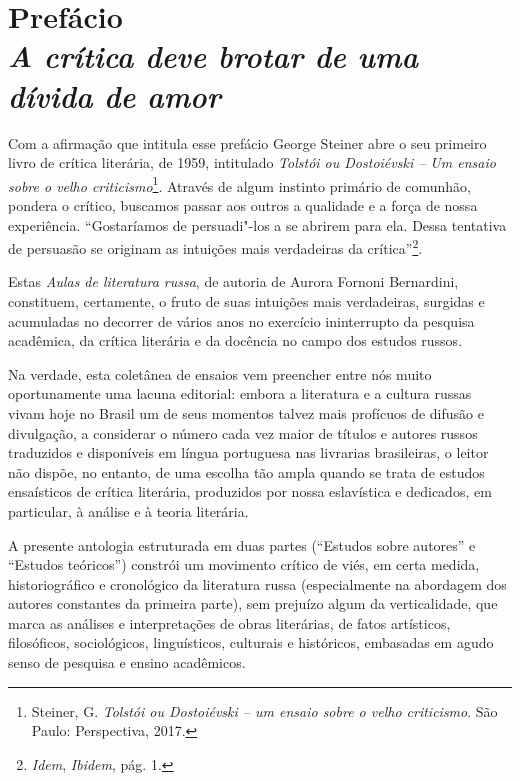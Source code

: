 \chapter*{Prefácio\\
\bigskip
\emph{A crítica deve brotar de uma dívida de amor}}




Com a afirmação que intitula esse prefácio George Steiner abre o seu primeiro livro de crítica
literária, de 1959, intitulado \emph{Tolstói ou Dostoiévski -- Um ensaio
sobre o velho criticismo}\footnote{Steiner, G. \emph{Tolstói ou
  Dostoiévski -- um ensaio sobre o velho criticismo}. São Paulo:
  Perspectiva, 2017.}. Através de algum instinto primário de comunhão,
pondera o crítico, buscamos passar aos outros a qualidade e a força de
nossa experiência. ``Gostaríamos de persuadi"-los a se abrirem para ela.
Dessa tentativa de persuasão se originam as intuições mais verdadeiras
da crítica''\footnote{\emph{Idem}, \emph{Ibidem}, pág. 1.}.

Estas \emph{Aulas de literatura russa}, de autoria de Aurora Fornoni
Bernardini, constituem, certamente, o fruto de suas intuições mais
verdadeiras, surgidas e acumuladas no decorrer de vários anos no
exercício ininterrupto da pesquisa acadêmica, da crítica literária e da
docência no campo dos estudos russos.

Na verdade, esta coletânea de ensaios vem preencher entre nós muito
oportunamente uma lacuna editorial: embora a literatura e a cultura
russas vivam hoje no Brasil um de seus momentos talvez mais profícuos de
difusão e divulgação, a considerar o número cada vez maior de títulos e
autores russos traduzidos e disponíveis em língua portuguesa nas
livrarias brasileiras, o leitor não dispõe, no entanto, de uma escolha
tão ampla quando se trata de estudos ensaísticos de crítica literária,
produzidos por nossa eslavística e dedicados, em particular, à análise e
à teoria literária.

A presente antologia estruturada em duas partes (``Estudos sobre
autores'' e ``Estudos teóricos'') constrói um movimento crítico de viés,
em certa medida, historiográfico e cronológico da literatura russa
(especialmente na abordagem dos autores constantes da primeira parte),
sem prejuízo algum da verticalidade, que marca as análises e
interpretações de obras literárias, de fatos artísticos, filosóficos,
sociológicos, linguísticos, culturais e históricos, embasadas em agudo
senso de pesquisa e ensino acadêmicos.

